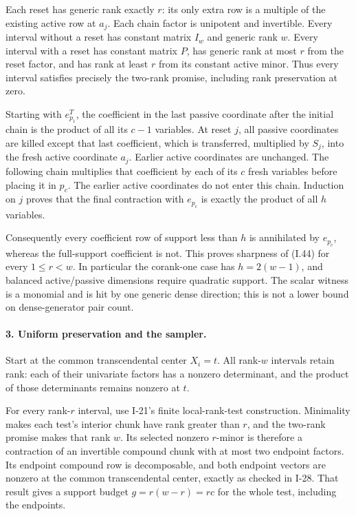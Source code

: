 Each reset has generic rank exactly $r$: its only extra
row is a multiple of the existing active row at $a_j$.
Each chain factor is unipotent and invertible.  Every
interval without a reset has constant matrix $I_w$ and
generic rank $w$.  Every interval with a reset has constant
matrix $P$, has generic rank at most $r$ from the reset
factor, and has rank at least $r$ from its constant active
minor.  Thus every interval satisfies precisely the
two-rank promise, including rank preservation at zero.

Starting with $e_{p_1}^T$, the coefficient in the last
passive coordinate after the initial chain is the product
of all its $c-1$ variables.  At reset $j$, all passive
coordinates are killed except that last coefficient,
which is transferred, multiplied by $S_j$, into the
fresh active coordinate $a_j$.  Earlier active coordinates
are unchanged.  The following chain multiplies that
coefficient by each of its $c$ fresh variables before
placing it in $p_c$.  The earlier active coordinates
do not enter this chain.  Induction on $j$ proves that
the final contraction with $e_{p_c}$ is exactly the
product of all $h$ variables.

Consequently every coefficient row of support less than
$h$ is annihilated by $e_{p_c}$, whereas the full-support
coefficient is not.  This proves sharpness of (I.44) for
every $1\le r<w$.  In particular the corank-one case has
$h=2(w-1)$, and balanced active/passive dimensions require
quadratic support.  The scalar witness is a monomial and
is hit by one generic dense direction; this is not a
lower bound on dense-generator pair count.

\paragraph{3. Uniform preservation and the sampler.}
Start at the common transcendental center $X_i=t$.
All rank-$w$ intervals retain rank: each of their univariate
factors has a nonzero determinant, and the product of those
determinants remains nonzero at $t$.

For every rank-$r$ interval, use I-21's finite local-rank-test
construction.  Minimality makes each test's interior chunk
have rank greater than $r$, and the two-rank promise makes
that rank $w$.  Its selected nonzero $r$-minor is therefore
a contraction of an invertible compound chunk with at most
two endpoint factors.  Its endpoint compound row is
decomposable, and both endpoint vectors are nonzero at the
common transcendental center, exactly as checked in I-28.
That result gives a support budget $g=r(w-r)=rc$ for the
whole test, including the endpoints.

